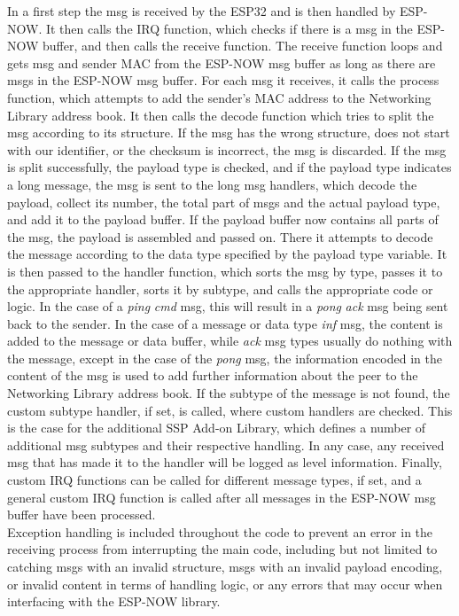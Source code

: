 In a first step the msg is received by the ESP32 and is then handled by ESP-NOW. It then calls the IRQ function, which checks if there is a msg in the ESP-NOW buffer, and then calls the receive function. The receive function loops and gets msg and sender MAC from the ESP-NOW msg buffer as long as there are msgs in the ESP-NOW msg buffer. For each msg it receives, it calls the process function, which attempts to add the sender's MAC address to the Networking Library address book. It then calls the decode function which tries to split the msg according to its structure. If the msg has the wrong structure, does not start with our identifier, or the checksum is incorrect, the msg is discarded. If the msg is split successfully, the payload type is checked, and if the payload type indicates a long message, the msg is sent to the long msg handlers, which decode the payload, collect its number, the total part of msgs and the actual payload type, and add it to the payload buffer. If the payload buffer now contains all parts of the msg, the payload is assembled and passed on. There it attempts to decode the message according to the data type specified by the payload type variable. It is then passed to the handler function, which sorts the msg by type, passes it to the appropriate handler, sorts it by subtype, and calls the appropriate code or logic. In the case of a \textit{ping} \textit{cmd} msg, this will result in a \textit{pong} \textit{ack} msg being sent back to the sender. In the case of a message or data type \textit{inf} msg, the content is added to the message or data buffer, while \textit{ack} msg types usually do nothing with the message, except in the case of the \textit{pong} msg, the information encoded in the content of the msg is used to add further information about the peer to the Networking Library address book. If the subtype of the message is not found, the custom subtype handler, if set, is called, where custom handlers are checked. This is the case for the additional SSP Add-on Library, which defines a number of additional msg subtypes and their respective handling. In any case, any received msg that has made it to the handler will be logged as level information. Finally, custom IRQ functions can be called for different message types, if set, and a general custom IRQ function is called after all messages in the ESP-NOW msg buffer have been processed. \\

Exception handling is included throughout the code to prevent an error in the receiving process from interrupting the main code, including but not limited to catching msgs with an invalid structure, msgs with an invalid payload encoding, or invalid content in terms of handling logic, or any errors that may occur when interfacing with the ESP-NOW library.

